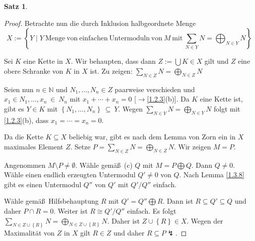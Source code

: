 \documentclass[
twoside=semi,
fontsize=12,
DIV=12, 
cleardoublepage=current,
leqno,
headings=optiontoheadandtoc, 
toc=idx
]{scrbook}
\newcommand{\N}{\mathbb{N}}
\newcommand{\set}[1]{\left\{ #1 \right\}}
\theoremstyle{definition}
\newtheorem{satz}[definition]{Satz}
\begin{document}
\begin{satz}
\begin{proof}
			\bigskip
			\noindent Betrachte nun die durch Inklusion halbgeordnete Menge 
				\[X:= \set{Y \mid Y\ \mathrm{Menge\ von\ einfachen\ Untermoduln\ von}\ M\ \mathrm{mit}\ \sum_{N \in Y}N = \bigoplus_{N \in Y}N}\]
				
			\noindent Sei $K$ eine Kette in $X$. Wir behaupten, dass dann $Z:= \bigcup K \in X$ gilt und $Z$ eine obere Schranke von $K$ in $X$ ist. \newline
			Zu zeigen: $\displaystyle \sum_{N \in Z} N = \bigoplus_{N \in Z} N$
			
			\noindent Seien nun $n \in \N$ und $N_1, \dots, N_n \in Z$ paarweise verschieden und $x_1 \in N_1, \dots, x_n~\in~N_n$ mit $x_1 + \cdots + x_n = 0$ [$\rightarrow$\ref{1.2.3}(b)]. Da $K$ eine Kette ist, gibt es $Y \in K$ mit $\set{N_1, \dots, N_n}~\subseteq~Y$. Wegen $\displaystyle \sum_{N \in Y}N = \bigoplus_{N \in Y}N$ folgt mit \ref{1.2.3}(b), dass $x_1 = \cdots = x_n = 0$.
			
			\noindent Da die Kette $K \subseteq X$ beliebig war, gibt es nach dem Lemma von Zorn ein in $X$ maximales Element $Z$. Setze $\displaystyle P = \sum_{N \in Z} N = \bigoplus_{N \in Z}N$. Wir zeigen $M = P$.
			
			\noindent Angenommen $M \setminus P \neq \emptyset$. W\"ahle gem\"a\ss\ (c) $Q$ mit $M = P \bigoplus Q$. Dann $Q \neq 0$. W\"ahle einen endlich erzeugten Untermodul $Q'\neq 0$ von $Q$. Nach Lemma \ref{1.3.8} gibt es einen Untermodul $Q''$ von $Q'$ mit $Q'/Q''$ einfach.
			
			\noindent W\"ahle gem\"a\ss\ Hilfsbehauptung $R$ mit $Q' = Q'' \bigoplus R$. Dann ist $R \subseteq Q' \subseteq Q$ und daher $P \cap R = 0$. Weiter ist $R\cong Q'/Q''$ einfach. Es folgt $\displaystyle \sum_{N \in Z \cup \set{R}}N = \bigoplus_{N \in Z \cup \set{R}}N$. Daher ist $Z\cup \set{R} \in X$. Wegen der Maximalit\"at von $Z$ in $X$ gilt $R \in Z$ und daher $R \subseteq P \lightning$.
 		\end{proof} 
	\end{satz}
\end{document}
